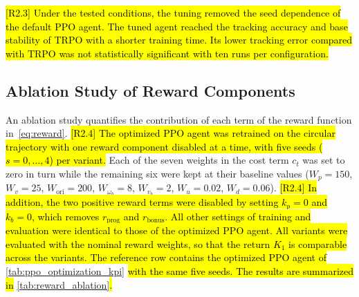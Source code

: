 \documentclass{ieeeaccess}
\newcommand{\hlone}[1]{{\sethlcolor{rone}\hl{#1}}}
\begin{document}
\hlone{[R2.3] Under the tested conditions, the tuning removed the seed dependence of the default PPO agent. The tuned
agent reached the tracking accuracy and base stability of TRPO with a shorter training time. Its lower
tracking error compared with TRPO was not statistically significant with ten runs per configuration.}

\subsection{Ablation Study of Reward Components}\label{sec:reward_ablation} An ablation study quantifies
the contribution of each term of the reward function in~\eqref{eq:reward}. \hlone{[R2.4] The
optimized PPO agent was retrained on the circular trajectory with one reward component disabled at a
time, with five seeds ($s = 0,\dots,4$) per variant.} Each of the seven weights in the cost term $c_t$ was
set to zero in turn while the remaining six were kept at their baseline values ($W_p=150$, $W_v=25$,
$W_{\mathrm{ori}}=200$, $W_{\omega_b}=8$, $W_{v_b}=2$, $W_u=0.02$, $W_d=0.06$). \hlone{[R2.4] In
addition, the two positive reward terms were disabled by setting $k_p = 0$ and $k_b = 0$, which removes
$r_{\mathrm{prog}}$ and $r_{\mathrm{bonus}}$. All other settings of training and evaluation were identical
to those of the optimized PPO agent. All variants were evaluated with the nominal reward weights, so that
the return $K_1$ is comparable across the variants. The reference row contains the optimized PPO agent of}
\cref{tab:ppo_optimization_kpi} \hlone{with the same five seeds. The results are summarized in}
\cref{tab:reward_ablation}\hlone{.}
\end{document}
